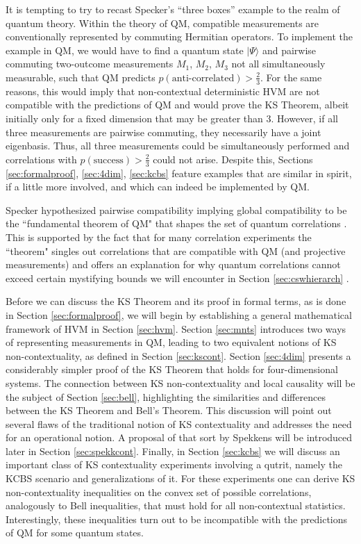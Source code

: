 It is tempting to try to recast Specker's “three boxes” example to the realm of quantum theory. Within the theory of QM, compatible measurements are conventionally represented by commuting Hermitian operators. To implement the example in QM, we would have to find a quantum state $|\Psi\rangle$ and pairwise commuting two-outcome measurements $M_{1}$, $M_{2}$, $M_{3}$ not all simultaneously measurable, such that QM predicts $p(\text{anti-correlated})>\frac{2}{3}$. For the same reasons, this would imply that non-contextual deterministic HVM are not compatible with the predictions of QM and would prove the KS Theorem, albeit initially only for a fixed dimension that may be greater than 3. However, if all three measurements are pairwise commuting, they necessarily have a joint eigenbasis. Thus, all three measurements could be simultaneously performed and correlations with $p(\text{success})>\frac{2}{3}$ could not arise. Despite this, Sections \ref{sec:formalproof}, \ref{sec:4dim}, \ref{sec:kcbs} feature examples that are similar in spirit, if a little more involved, and which can indeed be implemented by QM.

Specker hypothesized pairwise compatibility implying global compatibility to be the ``fundamental theorem of QM" that shapes the set of quantum correlations \cite{Cabello2012}. This is supported by the fact that for many correlation experiments the ``theorem" singles out correlations that are compatible with QM (and projective measurements) and offers an explanation for why quantum correlations cannot exceed certain mystifying bounds we will encounter in Section \ref{sec:cswhierarch} \cite{Cabello2013}.

Before we can discuss the KS Theorem and its proof in formal terms, as is done in Section \ref{sec:formalproof}, we will begin by establishing a general mathematical framework of HVM in Section \ref{sec:hvm}. Section \ref{sec:mnts} introduces two ways of representing measurements in QM, leading to two equivalent notions of KS non-contextuality, as defined in Section \ref{sec:kscont}. Section \ref{sec:4dim} presents a considerably simpler proof of the KS Theorem that holds for four-dimensional systems. The connection between KS non-contextuality and local causality will be the subject of Section \ref{sec:bell}, highlighting the similarities and differences between the KS Theorem and Bell's Theorem. This discussion will point out several flaws of the traditional notion of KS contextuality and addresses the need for an operational notion. A proposal of that sort by Spekkens will be introduced later in Section \ref{sec:spekkcont}. Finally, in Section \ref{sec:kcbs} we will discuss an important class of KS contextuality experiments involving a qutrit, namely the KCBS scenario and generalizations of it. For these experiments one can derive KS non-contextuality inequalities on the convex set of possible correlations, analogously to Bell inequalities, that must hold for all non-contextual statistics. Interestingly, these inequalities turn out to be incompatible with the predictions of QM for some quantum states.

